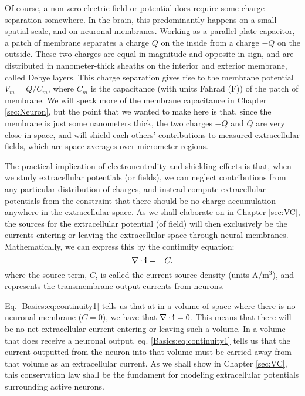 Of course, a non-zero electric field or potential does require some charge separation somewhere. In the brain, this predominantly happens on a small spatial scale, and on neuronal membranes. Working as a parallel plate capacitor, a patch of membrane separates a charge $Q$ on the inside from a charge $-Q$ on the outside. These two charges are equal in magnitude and opposite in sign,
and are distributed in nanometer-thick sheaths on the interior and exterior membrane, called Debye layers. This charge separation gives rise to the membrane potential $V_m = Q/C_m$, where $C_m$ is the capacitance (with units Fahrad (F)) of the patch of membrane. We will speak more of the membrane capacitance in Chapter \ref{sec:Neuron}, but the point that we wanted to make here is that, since the membrane is just some nanometers thick, the two charges $-Q$ and $Q$ are very close in space, and will shield each others' contributions to measured extracellular fields, which are space-averages over micrometer-regions.

The practical implication of electroneutrality and shielding effects is that, when we study extracellular potentials (or fields), we can neglect contributions from any particular distribution of charges, and instead compute extracellular potentials from the constraint that there should be no charge accumulation anywhere in the extracellular space. As we shall elaborate on in Chapter \ref{sec:VC}, the sources for the extracellular potential (of field) will then exclusively be the currents entering or leaving the extracellular space through neural membranes. Mathematically, we can express this by the continuity equation:
\begin{equation}
\nabla \cdot {\bf i} = -C.
\label{Basics:eq:continuity1}
\end{equation}
where the source term, $C$, is called the current source density (units A/m$^3$), and represents the transmembrane output currents from neurons. 

Eq. \ref{Basics:eq:continuity1} tells us that at in a volume of space where there is no neuronal membrane ($C = 0$), we have that $\nabla \cdot {\bf i} = 0$. This means that there will be no net extracellular current entering or leaving such a volume. In a volume that does receive a neuronal output, eq. \ref{Basics:eq:continuity1} tells us that the current outputted from the neuron into that volume must be carried away from that volume as an extracellular current. As we shall show in Chapter \ref{sec:VC}, this conservation law shall be the fundament for modeling extracellular potentials surrounding active neurons.

